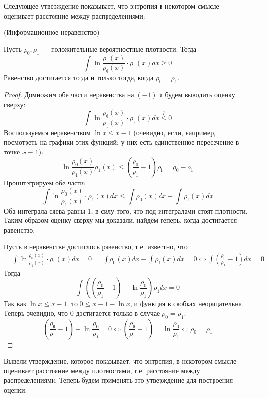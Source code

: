 Следующее утверждение показывает, что энтропия в некотором смысле оценивает расстояние между распределениями:
\begin{lemma*} (Информационное неравенство)

    Пусть $\rho_0, \rho_1$ --- положительные вероятностные плотности. Тогда
    \[
        \int \ln\frac{\rho_1(x)}{\rho_0(x)} \cdot \rho_1(x)dx \geq 0
    \]
    Равенство достигается тогда и только тогда, когда $\rho_0 = \rho_1$.
\end{lemma*}
\begin{proof}
    Домножим обе части неравенства на $(-1)$ и будем выводить оценку сверху:
    \[
        \int \ln\frac{\rho_0(x)}{\rho_1(x)} \cdot \rho_1(x)dx \overset{?}{\leq} 0
    \]
    Воспользуемся неравенством $\ln x \leq x - 1$ (очевидно, если, например, посмотреть на графики этих функций: у них есть единственное пересечение в
    точке $x = 1$):
    \[
        \ln\frac{\rho_0(x)}{\rho_1(x)}\rho_1(x) \leq \left( \frac{\rho_0}{\rho_1} - 1 \right)\rho_1 = \rho_0 - \rho_1
    \]
    Проинтегрируем обе части:
    \[
        \int \ln\frac{\rho_0(x)}{\rho_1(x)} \cdot \rho_1(x)dx \leq \int \rho_{0}(x)dx - \int \rho_{1}(x)dx
    \]
    Оба интеграла слева равны 1, в силу того, что под интегралами стоят плотности. Таким образом оценку сверху мы доказали, найдём теперь,
    когда достигается равенство.

    Пусть в неравенстве достиглось равенство, т.е. известно, что
    \begin{align*}
        &\int \ln\frac{\rho_0(x)}{\rho_1(x)} \cdot \rho_1(x)dx = 0
        &&\int \rho_{0}(x)dx - \int \rho_{1}(x)dx = 0 \iff \int \left(\frac{\rho_0}{\rho_1} - 1\right)dx = 0
    \end{align*}
    Тогда
    \[
        \int \left(\left(\frac{\rho_0}{\rho_1} - 1\right) - \ln\frac{\rho_0}{\rho_1}\right)\rho_{1}dx = 0
    \]
    Так как $\ln x \leq x - 1$, то $0 \leq x - 1 - \ln x$, и функция в скобках неорицательна. Теперь очевидно, что 0 достигается только в случае
    $\rho_0 = \rho_1$:
    \[
        \left(\frac{\rho_0}{\rho_1} - 1\right) - \ln\frac{\rho_0}{\rho_1} = 0
        \iff
        \left(\frac{\rho_0}{\rho_1} - 1\right) = \ln\frac{\rho_0}{\rho_1}
        \iff
        \rho_0 = \rho_1
    \]
\end{proof}

Вывели утверждение, которое показывает, что энтропия, в некотором смысле оценивает расстояние между плотностями, т.е. расстояние между распределениями.
Теперь будем применять это утверждение для построения оценки.

